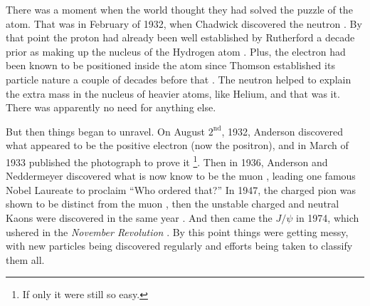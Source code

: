 There was a moment when the world thought they 
had solved the puzzle of the atom.
That was in February of 1932, when Chadwick discovered the
neutron \cite{Chadwick:1932ma}. By that point the proton had already been 
well established by Rutherford a decade prior as 
making up the nucleus of the Hydrogen
atom \cite{Rutherford:1911zz}. 
Plus, the electron had been known to be positioned inside the atom
since Thomson established its particle nature a couple of decades before
that \cite{thompson:electron}. 
The neutron helped to explain the extra mass in the nucleus of heavier
atoms, like Helium, and that was it. 
There was apparently no need for anything else. 


But then things began to unravel. On August $2^{\textrm{nd}}$, 1932, Anderson
discovered what appeared to be the positive electron (now the positron), 
and in March of 1933 published 
the photograph to prove it \cite{PhysRev.43.491}\footnote{If only it were still so easy.}. 
Then in 1936, Anderson and Neddermeyer discovered
what is now know to be the muon \cite{PhysRev.51.884}, 
leading one famous Nobel Laureate
to proclaim ``Who ordered that?'' 
In 1947, the charged pion was shown to be distinct 
from the muon \cite{Lattes:1947my},
then the unstable
charged and neutral Kaons were discovered in the 
same year \cite{Rochester:1947mi}.
And then came the $J/\psi$ in 1974, which ushered in the \emph{November Revolution} \cite{PhysRevLett.33.1404,PhysRevLett.33.1453}.  
By this point things were getting messy, with new particles being discovered regularly and efforts being taken to classify them all.


